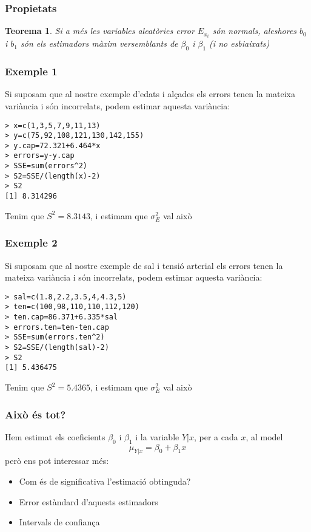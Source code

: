 \documentclass[12pt,t]{beamer}
\renewcommand{\emph}[1]{{\color{red}#1}}
\theoremstyle{plain}
\newtheorem{teorema}{Teorema}
\theoremstyle{definition}
\begin{document}
\begin{frame}
\frametitle{Propietats}

\begin{teorema}
Si \emph{a més} les variables aleatòries error $E_{x_i}$ són normals, aleshores
 $b_0$ i $b_1$ són els estimadors màxim versemblants de $\beta_0$ i $\beta_1$ (i no esbiaixats)
 \end{teorema}
\end{frame}





\begin{frame}[fragile]
\frametitle{Exemple 1}
Si suposam que al nostre exemple d'edats i alçades els errors tenen la mateixa variància i són incorrelats, podem estimar aquesta variància:
\begin{verbatim}
> x=c(1,3,5,7,9,11,13)
> y=c(75,92,108,121,130,142,155)
> y.cap=72.321+6.464*x
> errors=y-y.cap
> SSE=sum(errors^2)
> S2=SSE/(length(x)-2)
> S2
[1] 8.314296
\end{verbatim}
Tenim que $S^2=8.3143$, i estimam que $\sigma_E^2$ val això
\end{frame}

\begin{frame}[fragile]
\frametitle{Exemple 2}
Si suposam que al nostre exemple de sal i tensió arterial els errors  tenen la mateixa variància i són incorrelats, podem estimar aquesta variància:
\begin{verbatim}
> sal=c(1.8,2.2,3.5,4,4.3,5)
> ten=c(100,98,110,110,112,120)
> ten.cap=86.371+6.335*sal
> errors.ten=ten-ten.cap
> SSE=sum(errors.ten^2)
> S2=SSE/(length(sal)-2)
> S2
[1] 5.436475
\end{verbatim}
Tenim que $S^2=5.4365$, i estimam que $\sigma_E^2$ val això
\end{frame}





\begin{frame}
\frametitle{Això és tot?}
Hem estimat els coeficients $\beta_0$ i $\beta_1$ i la variable $Y|x$, per a cada $x$,  al model
$$
\mu_{Y|x}=\beta_0+\beta_1 x
$$
però ens pot interessar més:
\medskip

\begin{itemize}
\item Com és de significativa l'estimació obtinguda?
\medskip

\item Error estàndard d'aquests estimadors
\medskip

\item Intervals de confiança 
\end{itemize}
\end{frame}
\end{document}
